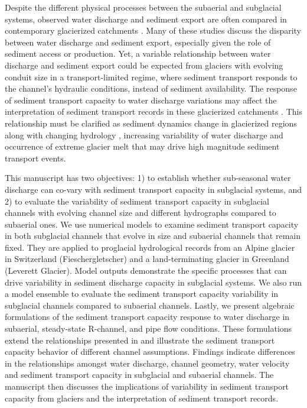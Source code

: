 \documentclass[tc, manuscript]{copernicus}
\begin{document}
Despite the different physical processes between the subaerial and subglacial systems, observed water discharge and sediment export are often compared in contemporary glacierized catchments \citep[e.g.][]{willis1996,hodson1998,pearce2003,richards2003,swift2005,chu2009,tedstone2012,chu2012,overeem2017,delaney2018,swift2021,lu2022,andresen2024}.
Many of these studies discuss the disparity between water discharge and sediment export, especially given the role of sediment access or production.
Yet, a variable relationship between water discharge and sediment export could be expected from glaciers with evolving conduit size in a transport-limited regime, where sediment transport responds to the channel's hydraulic conditions, instead of sediment availability.
The response of sediment transport capacity to water discharge variations may affect the interpretation of sediment transport records in these glacierized catchments \citep[e.g.][]{ganti2016,mancini2023}.
This relationship must be clarified as sediment dynamics change in glacierized regions along with changing hydrology \citep[e.g.][]{brunner2019}, increasing variability of water discharge \citep{lane2019b} and occurrence of extreme glacier melt  \citep[e.g.][]{overeem2015,cremona2023} that may drive high magnitude sediment transport events.

This manuscript has two objectives: 1)  to establish whether sub-seasonal water discharge can co-vary with sediment transport capacity in subglacial systems, and 2) to evaluate the variability of  sediment transport capacity in subglacial channels with evolving channel size and different hydrographs compared to subaerial ones.
We use numerical models to examine sediment transport capacity in both subglacial channels that evolve in size and subaerial channels that remain fixed.
They are applied to proglacial hydrological records from an Alpine glacier in Switzerland (Fieschergletscher) and a land-terminating glacier in Greenland (Leverett Glacier).
Model outputs demonstrate the specific processes that can drive variability in sediment discharge capacity in subglacial systems.
We also run a model ensemble to evaluate the sediment transport capacity variability in subglacial channels compared to subaerial channels.
Lastly, we present algebraic formulations of the sediment transport capacity response to water discharge in subaerial, steady-state R-channel, and pipe flow conditions.
These formulations extend the relationships presented in \citet{alley1997} and illustrate the sediment transport capacity behavior of different channel assumptions.
Findings indicate differences in the relationships amongst water discharge, channel geometry, water velocity and sediment transport capacity in subglacial and subaerial channels.
The manuscript then discusses the implications of variability in sediment transport capacity from glaciers and the interpretation of sediment transport records.
\end{document}
